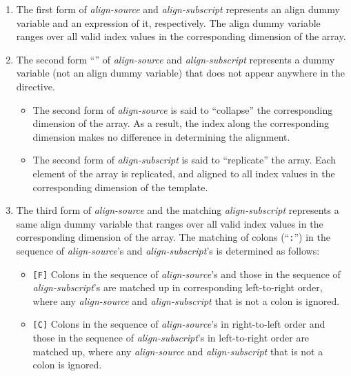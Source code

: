 \begin{enumerate}
\item The first form of {\it align-source} and {\it align-subscript}
      represents an align dummy variable and an expression of it,
      respectively. The align dummy variable ranges over all valid index
      values in the corresponding dimension of the array.
\item The second form ``{\tt *}'' of {\it align-source} and {\it
      align-subscript} represents a dummy variable (not an align dummy
      variable) that does not appear anywhere in the directive.
      \begin{itemize} 
       \item The second form of {\it align-source} is said to
	     ``collapse'' the corresponding dimension of the array. As a
	     result, the index along the corresponding dimension makes
	     no difference in determining the alignment.
       \item The second form of {\it align-subscript} is said to
	     ``replicate'' the array. Each element of the array is
	     replicated, and aligned to all index values in the
	     corresponding dimension of the template.
      \end{itemize}
\item The third form of {\it align-source} and the matching {\it
      align-subscript} represents a same align dummy variable that
      ranges over all valid index values in the corresponding dimension
      of the array. The matching of colons (``{\tt :}'') in the sequence
      of {\it align-source}'s and {\it align-subscript}'s is determined
      as follows:

      \begin{itemize}
       \item \verb![F]! Colons in the sequence of {\it align-source}'s
	     and those in the sequence of {\it align-subscript}'s are
	     matched up in corresponding left-to-right order, where any
	     {\it align-source} and {\it align-subscript} that is not a
	     colon is ignored.
       \item \verb![C]! Colons in the sequence of {\it align-source}'s
	     in right-to-left order and those in the sequence of {\it 
	     align-subscript}'s in left-to-right order are matched up,
	     where any {\it align-source} and {\it align-subscript} that
	     is not a colon is ignored.
      \end{itemize}


\end{enumerate}

